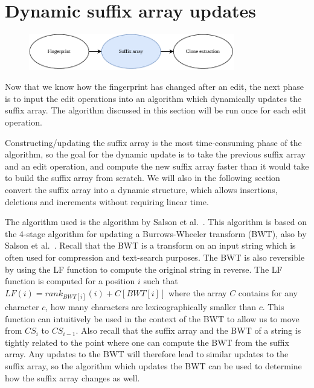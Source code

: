 \section{Dynamic suffix array updates}


\begin{figure}[H]
    \begin{center}
        \includegraphics[width=0.8\textwidth]{figures/phases/phases_suffix.drawio.pdf}
    \end{center}
\end{figure}

Now that we know how the fingerprint has changed after an edit, the next phase is to input
the edit operations into an algorithm which dynamically updates the suffix array. The
algorithm discussed in this section will be run once for each edit operation.

Constructing/updating the suffix array is the most time-consuming phase of the algorithm,
so the goal for the dynamic update is to take the previous suffix array and an edit
operation, and compute the new suffix array faster than it would take to build the suffix
array from scratch. We will also in the following section convert the suffix array into a
dynamic structure, which allows insertions, deletions and increments without requiring
linear time.

The algorithm used is the algorithm by Salson et al.~\cite{DynamicExtendedSuffixArrays}.
This algorithm is based on the 4-stage algorithm for updating a Burrows-Wheeler transform
(BWT), also by Salson et al.~\cite{DynamicBWT}. Recall that the BWT is a transform on an
input string which is often used for compression and text-search purposes. The BWT is also
reversible by using the LF function to compute the original string in reverse. The
LF function is computed for a position $i$ such that $LF(i) = rank_{BWT[i]}(i) + C[BWT[i]]$
where the array $C$ contains for any character $c$, how many characters are
lexicographically smaller than $c$. This function can intuitively be used in the context
of the BWT to allow us to move from $CS_i$ to $CS_{i-1}$. Also recall that the suffix
array and the BWT of a string is tightly related to the point where one can compute the
BWT from the suffix array. Any updates to the BWT will therefore lead to similar updates
to the suffix array, so the algorithm which updates the BWT can be used to determine how
the suffix array changes as well.


